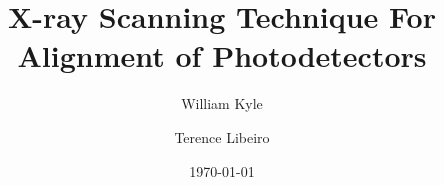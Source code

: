 \documentclass[preprint,5p]{elsarticle}
\begin{document}
\date{\today}%

\begin{frontmatter}
\title{X-ray Scanning Technique For Alignment of Photodetectors}
\author[uci]{William Kyle}
\author[uci]{Terence Libeiro}
\address[uci]{University of California, Irvine}

\begin{abstract}

\end{abstract}
\end{frontmatter}




















%
\end{document}
